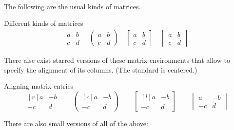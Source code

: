 The following are the usual kinds of matrices.
\begin{showlatex}{Different kinds of matrices}
\begin{gather*}
  \begin{matrix}
    a & b \\
    c & d
  \end{matrix}
  \quad
  \begin{pmatrix}
    a & b \\
    c & d
  \end{pmatrix}
  \quad
  \begin{bmatrix}
    a & b \\
    c & d
  \end{bmatrix}
  \quad
  \begin{vmatrix}
    a & b \\
    c & d
  \end{vmatrix}
\end{gather*}
\end{showlatex}
There alse exist starred versions of these matrix environments that allow to specify the alignment of its columns.
(The standard is centered.)
\begin{showlatex}{Aligning matrix entries}
\[
  \begin{matrix*}[r]
      a & -b \\
     -c &  d
  \end{matrix*}
  \qquad
  \begin{pmatrix*}[c]
    a & -b \\
    -c &  d
  \end{pmatrix*}
  \qquad
  \begin{bmatrix*}[l]
     a & -b \\
    -c &  d
  \end{bmatrix*}
  \qquad
  \begin{vmatrix}
     a & -b \\
    -c &  d
  \end{vmatrix}
\]
\end{showlatex}
There are also small versions of all of the above:
